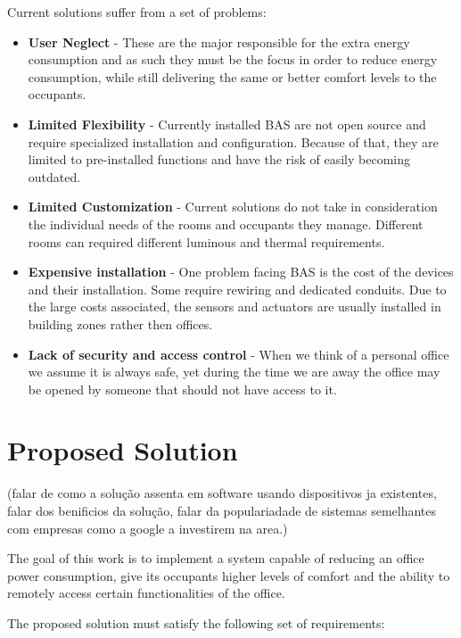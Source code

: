 Current solutions suffer from a set of problems:
\begin{itemize}
\item \textbf{User Neglect} - These are the major responsible for the extra energy consumption and as such they must be the focus in order to reduce energy consumption, while still delivering the same or better comfort levels to the occupants.
\item \textbf{Limited Flexibility} - Currently installed BAS are not open source and require specialized installation and configuration. Because of that, they are limited to pre-installed functions and have the risk of easily becoming outdated.
\item \textbf{Limited Customization} - Current solutions do not take in consideration the individual needs of the rooms and occupants they manage. Different rooms can required different luminous and thermal requirements. 
\item \textbf{Expensive installation} - One problem facing BAS is the cost of the devices and their installation. Some require rewiring  and dedicated conduits. Due to the large costs associated, the sensors and actuators are usually installed in building zones rather then offices.
\item \textbf{Lack of security and access control} - When we think of a personal office we assume it is always safe, yet during the time we are away the office may be opened by someone that should not have access to it.  
\end{itemize}



\section{Proposed Solution}
\label{section:proposed}
(falar de como a solução assenta em software usando dispositivos ja existentes, falar dos benificios da solução, falar da populariadade de sistemas semelhantes com empresas como a google a investirem na area.)


The goal of this work is to implement a system capable of reducing an office power consumption, give its occupants higher levels of comfort and the ability to remotely access certain functionalities of the office.


The proposed solution must satisfy the following set of requirements:

